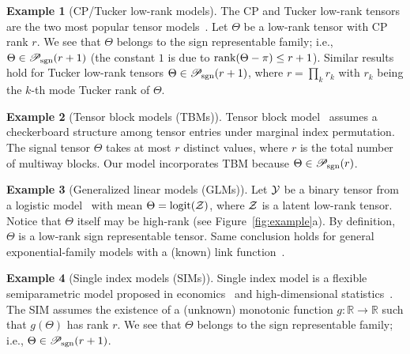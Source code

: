 \documentclass{article}
\theoremstyle{plain}
\theoremstyle{definition}
\newtheorem{example}{Example}
\def\rank{\textup{rank}}
\def\caliP{\mathscr{P}_{\textup{sgn}}}
\begin{document}
\vspace{.05cm}
\begin{example}[CP/Tucker low-rank models] The CP and Tucker low-rank tensors are the two most popular tensor models~\citep{kolda2009tensor}. Let $\Theta$ be a low-rank tensor with CP rank $r$. We see that $\Theta$ belongs to the sign representable family; i.e., $\Theta\in\caliP(r+1)$ (the constant $1$ is due to $\rank(\Theta-\pi)\leq r+1$). Similar results hold for Tucker low-rank tensors $\Theta\in\caliP(r+1)$, where $r=\prod_kr_k$ with $r_k$ being the $k$-th mode Tucker rank of $\Theta$.  
\end{example} 
\vspace{.05cm}

\begin{example}[Tensor block models (TBMs)] Tensor block model~\citep{wang2019multiway,chi2020provable} assumes a checkerboard structure among tensor entries under marginal index permutation. The signal tensor $\Theta$ takes at most $r$ distinct values, where $r$ is the total number of multiway blocks. Our model incorporates TBM because $\Theta \in \caliP(r)$. 
\end{example}
\vspace{.05cm}

\begin{example}[Generalized linear models (GLMs)] Let $\mathcal{Y}$ be a binary tensor from a logistic model~\citep{wang2018learning} with mean $\Theta=\text{logit}(\mathcal{Z})$, where $\mathcal{Z}$ is a latent low-rank tensor. Notice that $\Theta$ itself may be high-rank (see Figure~\ref{fig:example}a). By definition, $\Theta$ is a low-rank sign representable tensor. Same conclusion holds for general exponential-family models with a (known) link function~\citep{hong2020generalized}. 
\end{example}
\vspace{.05cm}

\begin{example}[Single index models (SIMs)] Single index model is a flexible semiparametric model proposed in economics~\citep{robinson1988root} and high-dimensional statistics~\citep{balabdaoui2019least,ganti2017learning}. The SIM assumes the existence of a (unknown) monotonic function $g\colon \mathbb{R}\to \mathbb{R}$ such that $g(\Theta)$ has rank $r$. We see that $\Theta$ belongs to the sign representable family; i.e., $\Theta\in \caliP(r+1)$. 
\end{example}
\vspace{.05cm}
\end{document}

